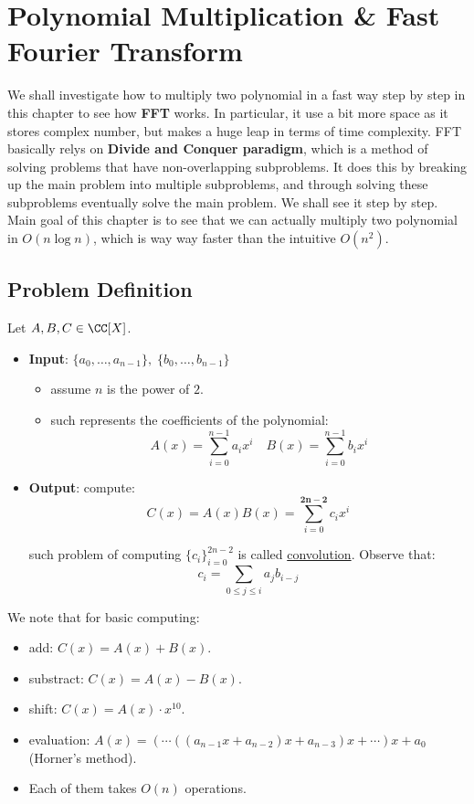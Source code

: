 \chapter{Polynomial Multiplication \& Fast Fourier Transform}

We shall investigate how to multiply two polynomial in a fast way step by step in this chapter to see how \textbf{FFT} works. In particular, it use a bit more space as it stores complex number, but makes a huge leap in terms of time complexity. FFT basically relys on \textbf{Divide and Conquer paradigm}, which is a method of solving problems that have non-overlapping subproblems. It does this by breaking up the main problem into multiple subproblems, and through solving these subproblems eventually solve the main problem. We shall see it step by step. Main goal of this chapter is to see that we can actually multiply two polynomial in \( O(n\log n) \), which is way way faster than the intuitive \( O(n^2) \).

\section{Problem Definition}

\begin{question}
	Let \( A, B, C \in \CC[X] \).
	\begin{itemize}
		\item \textbf{Input}: \( \{a_0, \ldots, a_{n-1}\}, \; \{b_0, \ldots, b_{n-1}\} \)
		      \begin{itemize}
			      \item assume \( n \) is the power of \( 2 \).
			      \item such represents the coefficients of the polynomial:
			            \[
				            A(x)= \sum_{i=0}^{n-1}a_i x^i \quad B(x) = \sum_{i=0}^{n-1}b_i x^i
			            \]
		      \end{itemize}
		\item \textbf{Output}: compute:
		      \[
			      C(x) = A(x)B(x) = \sum_{i=0}^{\mathbf{2n-2}}c_i x^i
		      \]

		      such problem of computing \( \{c_i\}_{i=0}^{2n-2} \) is called \underline{convolution}. Observe that:
		      \[
			      c_i = \sum_{0\leq j \leq i} a_j b_{i-j}
		      \]
	\end{itemize}
\end{question}

We note that for basic computing:
\begin{itemize}
	\item add: $C(x) = A(x) + B(x)$.
	\item substract: \( C(x) = A(x) - B(x) \).
	\item shift: \( C(x) = A(x) \cdot x^{10} \).
	\item evaluation: $A(x) = (\cdots((a_{n-1}x + a_{n-2})x + a_{n-3})x + \cdots ) x + a_0$ (Horner's method).
	\item Each of them takes \( O(n) \) operations.
\end{itemize}

